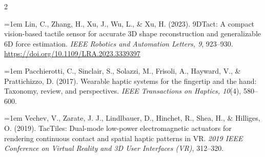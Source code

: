 \documentclass[a4paper, 11pt]{article}
\begin{document}
\begin{multicols}{2}
\begin{scriptsize}
    \noindent\hangindent=1em Lin, C., Zhang, H., Xu, J., Wu, L., \& Xu, H. (2023).
    9DTact: A compact vision-based tactile sensor for accurate 3D shape
    reconstruction and generalizable 6D force estimation.
    \textit{IEEE Robotics and Automation Letters, 9}, 923--930.
    \url{https://doi.org/10.1109/LRA.2023.3339397}


    \noindent\hangindent=1em Pacchierotti, C., Sinclair, S., Solazzi, M., Frisoli, A.,
    Hayward, V., \& Prattichizzo, D. (2017). Wearable haptic systems for the fingertip and the
    hand: Taxonomy, review, and perspectives. \textit{IEEE Transactions on Haptics, 10}(4),
    580--600.

    \noindent\hangindent=1em Vechev, V., Zarate, J. J., Lindlbauer, D., Hinchet, R., Shea, H.,
    \& Hilliges, O. (2019). TacTiles: Dual-mode low-power electromagnetic actuators for
    rendering continuous contact and spatial haptic patterns in VR. \textit{2019 IEEE
      Conference on Virtual Reality and 3D User Interfaces (VR)}, 312--320.

  \end{scriptsize}

\end{multicols}
\end{document}
